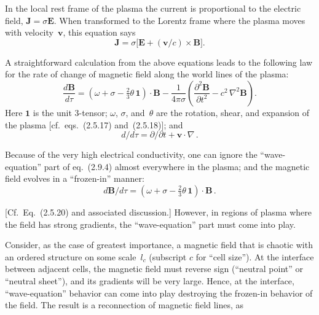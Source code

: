In the local rest frame of the plasma the current is proportional to the
electric field, $\mathbf{J} = \sigma\mathbf{E}$.  When transformed to the
Lorentz frame where the plasma moves with velocity~$\mathbf{v}$, this
equation says
%
\begin{equation}
  \mathbf{J} = \sigma\bigl[\mathbf{E}
    + (\mathbf{v}/c) \times \mathbf{B}\bigr].
  \tag{2.9.3}
\end{equation}

A straightforward calculation from the above equations leads to the following
law for the rate of change of magnetic field along the world lines of the
plasma:
%
\begin{equation}
  \frac{d\mathbf{B}}{d\tau}
  = (\omega + \sigma - \tfrac{2}{3}\theta\,\mathbf{1}) \cdot \mathbf{B}
    - \frac{1}{4\pi\sigma}\left(
      \frac{\partial^2\mathbf{B}}{\partial t^2}
      - c^2\,\nabla^2\mathbf{B}\right).
  \tag{2.9.4}
\end{equation}
%
Here $\mathbf{1}$ is the unit 3-tensor; $\omega$, $\sigma$, and~$\theta$ are
the rotation, shear, and expansion of the plasma
[cf.\ eqs.~(2.5.17) and~(2.5.18)]; and
%
\[
  d/d\tau = \partial/\partial t + \mathbf{v}\cdot\nabla\,.
\]

Because of the very high electrical conductivity, one can ignore the
``wave-equation'' part of eq.~(2.9.4) almost everywhere in the plasma;
and the magnetic field evolves in a ``frozen-in'' manner:
%
\begin{equation}
  d\mathbf{B}/d\tau
  = (\omega + \sigma - \tfrac{2}{3}\theta\,\mathbf{1}) \cdot \mathbf{B}\,.
  \tag{2.9.5}
\end{equation}

[Cf.\ Eq.~(2.5.20) and associated discussion.]  However, in regions of plasma
where the field has strong gradients, the ``wave-equation'' part must come
into play.

Consider, as the case of greatest importance, a magnetic field that is chaotic
with an ordered structure on some scale~$l_c$ (subscript $c$ for ``cell
size'').  At the interface between adjacent cells, the magnetic field must
reverse sign (``neutral point'' or ``neutral sheet''), and its gradients will
be very large.  Hence, at the interface, ``wave-equation'' behavior can come
into play destroying the frozen-in behavior of the field.  The result is a
reconnection of magnetic field lines, as

